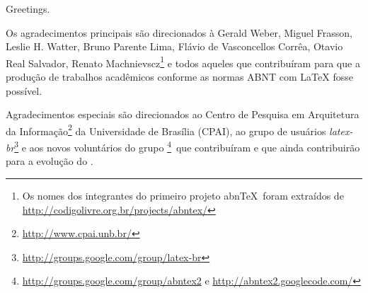 


\begin{agradecimentos}

\chooselang
{
    Greetings.
}
{
    Os agradecimentos principais são direcionados à Gerald Weber, Miguel Frasson,
    Leslie H. Watter, Bruno Parente Lima, Flávio de Vasconcellos Corrêa, Otavio Real
    Salvador, Renato Machnievscz\footnote{Os nomes dos integrantes do primeiro
    projeto abn\TeX\ foram extraídos de
    \url{http://codigolivre.org.br/projects/abntex/}} e todos aqueles que
    contribuíram para que a produção de trabalhos acadêmicos conforme
    as normas ABNT com \LaTeX{} fosse possível.

    Agradecimentos especiais são direcionados ao Centro de Pesquisa em Arquitetura
    da Informação\footnote{\url{http://www.cpai.unb.br/}} da Universidade de
    Brasília (CPAI), ao grupo de usuários
    \emph{latex-br}\footnote{\url{http://groups.google.com/group/latex-br}} e aos
    novos voluntários do grupo
    \emph{\abnTeX{}}\footnote{\url{http://groups.google.com/group/abntex2} e
    \url{http://abntex2.googlecode.com/}}~que contribuíram e que ainda
    contribuirão para a evolução do \abnTeX{}.
}

\end{agradecimentos}


%
%
%
